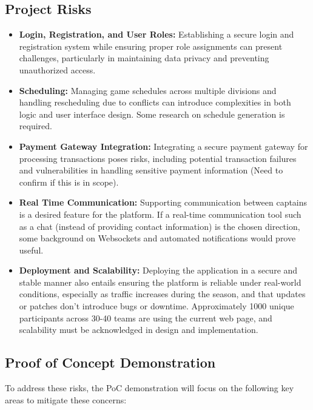 \documentclass{article}
\begin{document}
\subsection{Project Risks}

\begin{itemize}
  \item \textbf{Login, Registration, and User Roles:} Establishing a secure login and registration system while ensuring proper role assignments can present challenges, particularly in maintaining data privacy and preventing unauthorized access.
  \item \textbf{Scheduling:} Managing game schedules across multiple divisions and handling rescheduling due to conflicts can introduce complexities in both logic and user interface design. Some research on schedule generation is required.
  \item \textbf{Payment Gateway Integration:} Integrating a secure payment gateway for processing transactions poses risks, including potential transaction failures and vulnerabilities in handling sensitive payment information (Need to confirm if this is in scope).
  \item \textbf{Real Time Communication:} Supporting communication between captains is a desired feature for the platform. If a real-time communication tool such as a chat (instead of providing contact information) is the chosen direction, some background on Websockets and automated notifications would prove useful.
  \item \textbf{Deployment and Scalability:} Deploying the application in a secure and stable manner also entails ensuring the platform is reliable under real-world conditions, especially as traffic increases during the season, and that updates or patches don’t introduce bugs or downtime. Approximately 1000 unique participants across 30-40 teams are using the current web page, and scalability must be acknowledged in design and implementation.
\end{itemize}
\subsection{Proof of Concept Demonstration}

To address these risks, the PoC demonstration will focus on the following key areas to mitigate these concerns:
\end{document}
